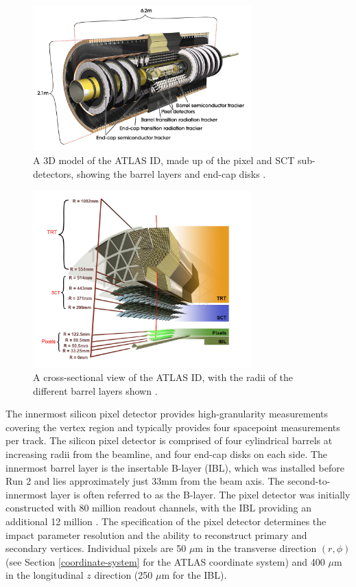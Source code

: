 \begin{figure}[!htbp]
  \centering
  \includegraphics[width=0.75\textwidth]{images/2-LHC-ATLAS/atlas_id.jpg}
  \caption{
    A 3D model of the ATLAS ID, made up of the pixel and SCT sub-detectors, showing the barrel layers and end-cap disks \cite{atlasid}.
  }
  \label{fig:atlas-id-run1}
\end{figure}

\begin{figure}[!htbp]
  \centering
  \includegraphics[width=0.75\textwidth]{images/2-LHC-ATLAS/atlas_id_xs.png}
  \caption{
    A cross-sectional view of the ATLAS ID, with the radii of the different barrel layers shown \cite{atlastrackingdocs}.
  }
  \label{fig:atlas-id-run2}
\end{figure}

The innermost silicon pixel detector \cite{pixel} provides high-granularity measurements covering the vertex region and typically provides four spacepoint measurements per track. The silicon pixel detector is comprised of four cylindrical barrels at increasing radii from the beamline, and four end-cap disks on each side. The innermost barrel layer is the insertable B-layer (IBL), which was installed before Run 2 \cite{ATLAS-TDR-19,PIX-2018-001} and lies approximately just 33mm from the beam axis. The second-to-innermost layer is often referred to as the B-layer. The pixel detector was initially constructed with 80 million readout channels, with the IBL providing an additional 12 million \cite{ibl}. The specification of the pixel detector determines the impact parameter resolution and the ability to reconstruct primary and secondary vertices. Individual pixels are 50 $\mu$m in the transverse direction $(r,\phi)$ (see Section \ref{coordinate-system} for the ATLAS coordinate system) and 400 $\mu$m in the longitudinal $z$ direction (250 $\mu$m for the IBL). 

